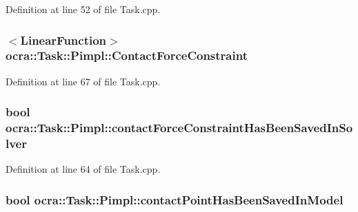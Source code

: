 Definition at line 52 of file Task.\+cpp.

\subsubsection[{\texorpdfstring{Contact\+Force\+Constraint}{ContactForceConstraint}}]{$<${\bf Linear\+Function}$>$ ocra\+::\+Task\+::\+Pimpl\+::\+Contact\+Force\+Constraint}\hypertarget{structocra_1_1Task_1_1Pimpl_afd9210ed3a558a170e75a7033e9ce4d8}{}\label{structocra_1_1Task_1_1Pimpl_afd9210ed3a558a170e75a7033e9ce4d8}


Definition at line 67 of file Task.\+cpp.

\subsubsection[{\texorpdfstring{contact\+Force\+Constraint\+Has\+Been\+Saved\+In\+Solver}{contactForceConstraintHasBeenSavedInSolver}}]{\setlength{\rightskip}{0pt plus 5cm}bool ocra\+::\+Task\+::\+Pimpl\+::contact\+Force\+Constraint\+Has\+Been\+Saved\+In\+Solver}\hypertarget{structocra_1_1Task_1_1Pimpl_abcedfdc974f594cd0c583c2e25eda984}{}\label{structocra_1_1Task_1_1Pimpl_abcedfdc974f594cd0c583c2e25eda984}


Definition at line 64 of file Task.\+cpp.

\subsubsection[{\texorpdfstring{contact\+Point\+Has\+Been\+Saved\+In\+Model}{contactPointHasBeenSavedInModel}}]{\setlength{\rightskip}{0pt plus 5cm}bool ocra\+::\+Task\+::\+Pimpl\+::contact\+Point\+Has\+Been\+Saved\+In\+Model}\hypertarget{structocra_1_1Task_1_1Pimpl_a609e0fedd60809c80e0381eafd97063a}{}\label{structocra_1_1Task_1_1Pimpl_a609e0fedd60809c80e0381eafd97063a}


